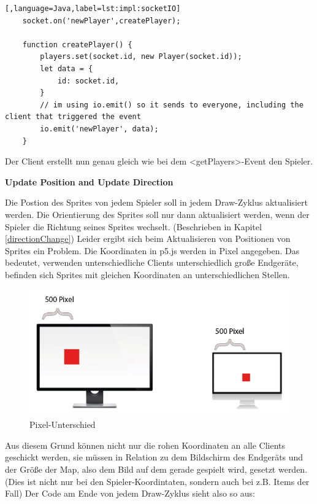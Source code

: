 \begin{lstlisting}[,language=Java,label=lst:impl:socketIO]
    socket.on('newPlayer',createPlayer);  

    function createPlayer() {
        players.set(socket.id, new Player(socket.id));
        let data = {
            id: socket.id,
        }
        // im using io.emit() so it sends to everyone, including the client that triggered the event
        io.emit('newPlayer', data);
    }
\end{lstlisting}

Der Client erstellt nun genau gleich wie bei dem <getPlayers>-Event den Spieler.

\textbf{Update Position and Update Direction}

Die Postion des Sprites von jedem Spieler soll in jedem Draw-Zyklus aktualisiert werden. Die Orientierung des Sprites soll nur dann aktualisiert werden, wenn der Spieler die Richtung seines Sprites wechselt. (Beschrieben in Kapitel \ref{directionChange})
Leider ergibt sich beim Aktualisieren von Positionen von Sprites ein Problem. Die Koordinaten in p5.js werden in Pixel angegeben. Das bedeutet, verwenden unterschiedliche Clients unterschiedlich große Endgeräte, befinden sich Sprites mit gleichen Koordinaten an unterschiedlichen Stellen.

\begin{figure}[H]
    \centering
    \includegraphics[scale=0.9]{pics/pixelDiff.PNG}
    \caption{Pixel-Unterschied}
\end{figure}

Aus diesem Grund können nicht nur die rohen Koordinaten an alle Clients geschickt werden, sie müssen in Relation zu dem Bildschirm des Endgeräts und der Größe der Map, also dem Bild auf dem gerade gespielt wird, gesetzt werden.
(Dies ist nicht nur bei den Spieler-Koordintaten, sondern auch bei z.B. Items der Fall)
Der Code am Ende von jedem Draw-Zyklus sieht also so aus:


